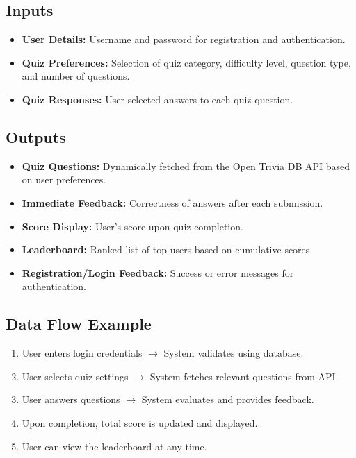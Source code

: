 \documentclass[12pt,a4paper]{article}
\begin{document}
\subsection*{Inputs}
\begin{itemize}
    \item \textbf{User Details:} Username and password for registration and authentication.
    \item \textbf{Quiz Preferences:} Selection of quiz category, difficulty level, question type, and number of questions.
    \item \textbf{Quiz Responses:} User-selected answers to each quiz question.
\end{itemize}

\subsection*{Outputs}
\begin{itemize}
    \item \textbf{Quiz Questions:} Dynamically fetched from the Open Trivia DB API based on user preferences.
    \item \textbf{Immediate Feedback:} Correctness of answers after each submission.
    \item \textbf{Score Display:} User's score upon quiz completion.
    \item \textbf{Leaderboard:} Ranked list of top users based on cumulative scores.
    \item \textbf{Registration/Login Feedback:} Success or error messages for authentication.
\end{itemize}

\subsection*{Data Flow Example}
\begin{enumerate}
    \item User enters login credentials $\rightarrow$ System validates using database.
    \item User selects quiz settings $\rightarrow$ System fetches relevant questions from API.
    \item User answers questions $\rightarrow$ System evaluates and provides feedback.
    \item Upon completion, total score is updated and displayed.
    \item User can view the leaderboard at any time.
\end{enumerate}
\end{document}
